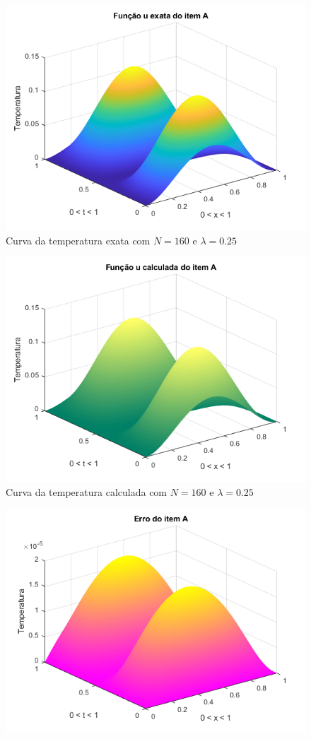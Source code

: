 \documentclass[12pt]{article}
\begin{document}
\begin{spacing}{1.5}
\begin{figure}
    \centering
    \includegraphics[width=0.8\linewidth]{Primeira_Tarefa/ItemA/n160_lambda0-25_exata.png}
    \caption{Curva da temperatura exata com $N=160$ e $\lambda=0.25$}
    \label{fig:A_n160lambda0-25_exata}
\end{figure}
\begin{figure}
    \centering
    \includegraphics[width=0.8\linewidth]{Primeira_Tarefa/ItemA/n160_lambda0-25_calc.png}
    \caption{Curva da temperatura calculada com $N=160$ e $\lambda=0.25$}
    \label{fig:A_n160lambda0-25_calc}
\end{figure}
\begin{figure}
    \centering
    \includegraphics[width=0.8\linewidth]{Primeira_Tarefa/ItemA/n160_lambda0-25_erro.png}

\end{figure}
\end{spacing}
\end{document}
